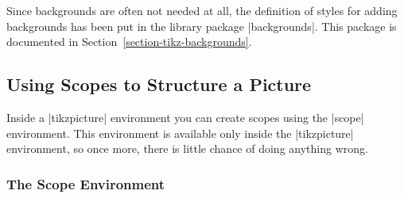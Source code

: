Since backgrounds are often not needed at all, the definition of
styles for adding backgrounds has been put in the library package
|backgrounds|. This package is documented in
Section~\ref{section-tikz-backgrounds}.


\subsection{Using Scopes to Structure a Picture}

Inside a |{tikzpicture}| environment you can create scopes
using the |{scope}| environment. This environment is available only
inside the |{tikzpicture}| environment, so once more, there is little
chance of doing anything wrong.

\subsubsection{The Scope Environment}

